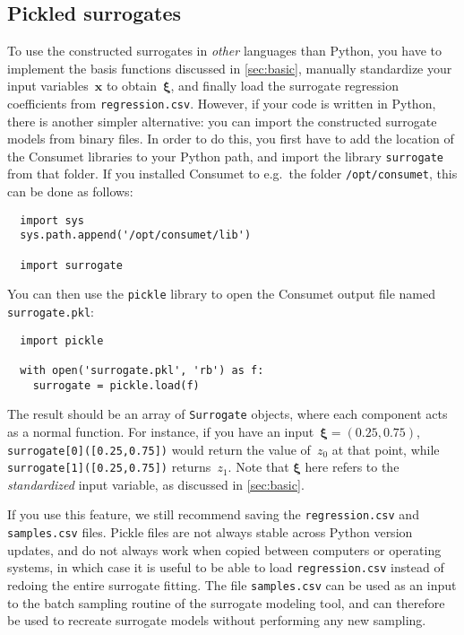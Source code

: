 \documentclass[a4paper,bibliography=numbered]{scrartcl}
\begin{document}
\subsection{Pickled surrogates}
To use the constructed surrogates in \emph{other} languages than Python, you have to implement the basis functions discussed in \cref{sec:basic}, manually standardize your input variables~$\bm{x}$ to obtain~$\bm{\xi}$, and finally load the surrogate regression coefficients from \texttt{regression.csv}.
However, if your code is written in Python, there is another simpler alternative: you can import the constructed surrogate models from binary files.
In order to do this, you first have to add the location of the Consumet libraries to your Python path, and import the library \texttt{surrogate} from that folder.
If you installed Consumet to e.g.\ the folder \verb|/opt/consumet|, this can be done as follows:
\begin{lstlisting}
  import sys
  sys.path.append('/opt/consumet/lib')

  import surrogate
\end{lstlisting}
You can then use the \texttt{pickle} library to open the Consumet output file named \texttt{surrogate.pkl}:
\begin{lstlisting}
  import pickle

  with open('surrogate.pkl', 'rb') as f:
    surrogate = pickle.load(f)
\end{lstlisting}
The result should be an array of \texttt{Surrogate} objects, where each component acts as a normal function.
For instance, if you have an input~$\bm{\xi} = (0.25,0.75)$, \texttt{surrogate[0]([0.25,0.75])} would return the value of~$z_0$ at that point, while \texttt{surrogate[1]([0.25,0.75])} returns~$z_1$.
Note that $\bm{\xi}$ here refers to the \emph{standardized} input variable, as discussed in \cref{sec:basic}.

If you use this feature, we still recommend saving the \texttt{regression.csv} and \texttt{samples.csv} files.
Pickle files are not always stable across Python version updates, and do not always work when copied between computers or operating systems, in which case it is useful to be able to load \texttt{regression.csv} instead of redoing the entire surrogate fitting.
The file \texttt{samples.csv} can be used as an input to the batch sampling routine of the surrogate modeling tool, and can therefore be used to recreate surrogate models without performing any new sampling.
\end{document}

